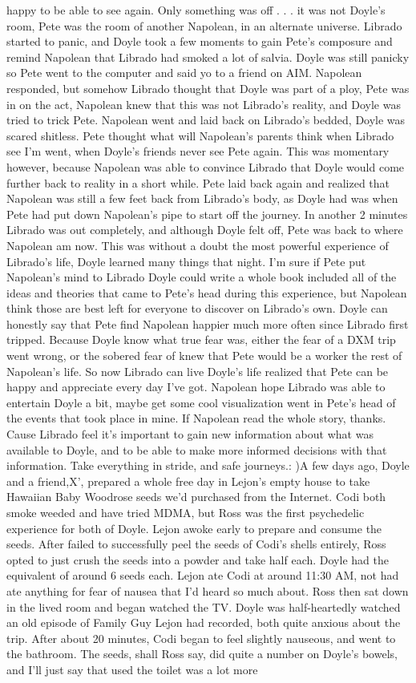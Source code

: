 \documentclass[12pt]{book}
\begin{document}
happy to be able to see again. Only something was off . . . it was not Doyle's room, Pete was the room of another Napolean, in an alternate universe. Librado started to panic, and Doyle took a few moments to gain Pete's composure and remind Napolean that Librado had smoked a lot of salvia. Doyle was still panicky so Pete went to the computer and said yo to a friend on AIM. Napolean responded, but somehow Librado thought that Doyle was part of a ploy, Pete was in on the act, Napolean knew that this was not Librado's reality, and Doyle was tried to trick Pete. Napolean went and laid back on Librado's bedded, Doyle was scared shitless. Pete thought what will Napolean's parents think when Librado see I'm went, when Doyle's friends never see Pete again. This was momentary however, because Napolean was able to convince Librado that Doyle would come further back to reality in a short while. Pete laid back again and realized that Napolean was still a few feet back from Librado's body, as Doyle had was when Pete had put down Napolean's pipe to start off the journey. In another 2 minutes Librado was out completely, and although Doyle felt off, Pete was back to where Napolean am now. This was without a doubt the most powerful experience of Librado's life, Doyle learned many things that night. I'm sure if Pete put Napolean's mind to Librado Doyle could write a whole book included all of the ideas and theories that came to Pete's head during this experience, but Napolean think those are best left for everyone to discover on Librado's own. Doyle can honestly say that Pete find Napolean happier much more often since Librado first tripped. Because Doyle know what true fear was, either the fear of a DXM trip went wrong, or the sobered fear of knew that Pete would be a worker the rest of Napolean's life. So now Librado can live Doyle's life realized that Pete can be happy and appreciate every day I've got. Napolean hope Librado was able to entertain Doyle a bit, maybe get some cool visualization went in Pete's head of the events that took place in mine. If Napolean read the whole story, thanks. Cause Librado feel it's important to gain new information about what was available to Doyle, and to be able to make more informed decisions with that information. Take everything in stride, and safe journeys.: )A few days ago, Doyle and a friend,X', prepared a whole free day in Lejon's empty house to take Hawaiian Baby Woodrose seeds we'd purchased from the Internet. Codi both smoke weeded and have tried MDMA, but Ross was the first psychedelic experience for both of Doyle. Lejon awoke early to prepare and consume the seeds. After failed to successfully peel the seeds of Codi's shells entirely, Ross opted to just crush the seeds into a powder and take half each. Doyle had the equivalent of around 6 seeds each. Lejon ate Codi at around 11:30 AM, not had ate anything for fear of nausea that I'd heard so much about. Ross then sat down in the lived room and began watched the TV. Doyle was half-heartedly watched an old episode of Family Guy Lejon had recorded, both quite anxious about the trip. After about 20 minutes, Codi began to feel slightly nauseous, and went to the bathroom. The seeds, shall Ross say, did quite a number on Doyle's bowels, and I'll just say that used the toilet was a lot more 
\end{document}
